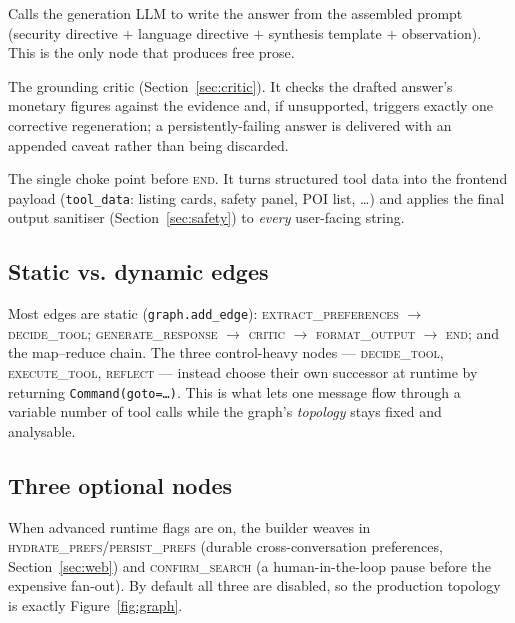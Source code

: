 \documentclass[11pt,a4paper]{article}
\newcommand{\code}[1]{\texttt{\small #1}}
\newcommand{\gnode}[1]{\textsc{#1}}  %
\begin{document}
\begin{description}[leftmargin=0pt,itemsep=3pt]
  \item[\gnode{generate\_response}.] Calls the generation LLM to write the answer from
  the assembled prompt (security directive $+$ language directive $+$ synthesis
  template $+$ observation). This is the only node that produces free prose.

  \item[\gnode{critic}.] The grounding critic (Section~\ref{sec:critic}). It checks
  the drafted answer's monetary figures against the evidence and, if unsupported,
  triggers exactly one corrective regeneration; a persistently-failing answer is
  delivered with an appended caveat rather than being discarded.

  \item[\gnode{format\_output}.] The single choke point before \gnode{end}. It turns
  structured tool data into the frontend payload (\code{tool\_data}: listing cards,
  safety panel, POI list, \dots) and applies the final output sanitiser
  (Section~\ref{sec:safety}) to \emph{every} user-facing string.
\end{description}

\subsection{Static vs. dynamic edges}
Most edges are static (\code{graph.add\_edge}): \gnode{extract\_preferences} $\to$
\gnode{decide\_tool}; \gnode{generate\_response} $\to$ \gnode{critic} $\to$
\gnode{format\_output} $\to$ \gnode{end}; and the map--reduce chain. The three
control-heavy nodes --- \gnode{decide\_tool}, \gnode{execute\_tool}, \gnode{reflect}
--- instead choose their own successor at runtime by returning
\code{Command(goto=\dots)}. This is what lets one message flow through a variable
number of tool calls while the graph's \emph{topology} stays fixed and analysable.

\subsection{Three optional nodes}
When advanced runtime flags are on, the builder weaves in
\gnode{hydrate\_prefs}/\gnode{persist\_prefs} (durable cross-conversation preferences,
Section~\ref{sec:web}) and \gnode{confirm\_search} (a human-in-the-loop pause before
the expensive fan-out). By default all three are disabled, so the production topology
is exactly Figure~\ref{fig:graph}.

\end{document}
